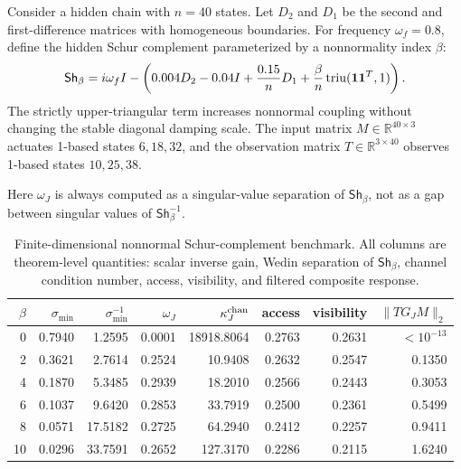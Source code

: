 \documentclass[review]{siamart220329}
\theoremstyle{definition}
\theoremstyle{remark}
\newcommand{\R}{\mathbb{R}}
\newcommand{\Sh}{\mathsf{Sh}}
\begin{document}
Consider a hidden chain with $n=40$ states. Let $D_2$ and $D_1$ be the second and
first-difference matrices with homogeneous boundaries. For frequency
$\omega_f=0.8$, define the hidden Schur complement parameterized by a
nonnormality index $\beta$:
\begin{equation}
    \Sh_\beta=i\omega_f I- \left( 0.004D_2-0.04I+\frac{0.15}{n}D_1+\frac{\beta}{n}\operatorname{triu}({\bf 1}{\bf 1}^T,1) \right).
    \label{eq:application-schur}
\end{equation}
The strictly upper-triangular term increases nonnormal coupling without changing
the stable diagonal damping scale. The input matrix $M\in\R^{40\times 3}$
actuates 1-based states $6,18,32$, and the observation matrix $T\in\R^{3\times 40}$
observes 1-based states $10,25,38$.

Here $\omega_J$ is always computed as a singular-value separation of $\Sh_\beta$, not as a gap between singular values of $\Sh_\beta^{-1}$.

\begin{table}[h]
\centering
\caption{Finite-dimensional nonnormal Schur-complement benchmark. All columns are theorem-level quantities: scalar inverse gain, Wedin separation of $\Sh_\beta$, channel condition number, access, visibility, and filtered composite response.}
\label{tab:application-beta}
\begin{tabular}{@{}rrrrrrrr@{}}
\toprule
$\beta$ & $\sigma_{\min}$ & $\sigma_{\min}^{-1}$ & $\omega_J$ & $\kappa_J^{\rm chan}$ & access & visibility & $\|TG_JM\|_2$ \\
\midrule
0  & 0.7940 & 1.2595 & 0.0001 & 18918.8064 & 0.2763 & 0.2631 & $<10^{-13}$ \\
2  & 0.3621 & 2.7614 & 0.2524 & 10.9408 & 0.2632 & 0.2547 & 0.1350 \\
4  & 0.1870 & 5.3485 & 0.2939 & 18.2010 & 0.2566 & 0.2443 & 0.3053 \\
6  & 0.1037 & 9.6420 & 0.2853 & 33.7919 & 0.2500 & 0.2361 & 0.5499 \\
8  & 0.0571 & 17.5182 & 0.2725 & 64.2940 & 0.2412 & 0.2257 & 0.9411 \\
10  & 0.0296 & 33.7591 & 0.2652 & 127.3170 & 0.2286 & 0.2115 & 1.6240 \\
\bottomrule
\end{tabular}
\end{table}
\end{document}

